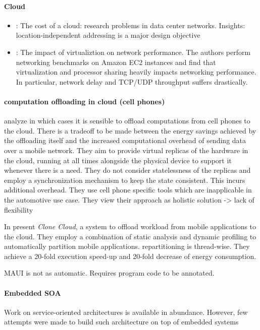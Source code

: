 \paragraph{Cloud}

\begin{itemize}
	\item \cite{greenberg2008cost}: The cost of a cloud: research problems in data center networks. Insights: location-independent addressing is a major design objective
	\item \cite{wang2010impact}: The impact of virtualiztion on network performance. The authors perform networking benchmarks on Amazon EC2 instances and find that virtualization and processor sharing heavily impacts networking performance. In particular, network delay and TCP/UDP throughput suffers drastically.
\end{itemize}

\paragraph{computation offloading in cloud (cell phones)}
\citeauthor*{barbera2013offload} \cite{barbera2013offload} analyze in which cases it is sensible to offload computations from cell phones to the cloud. There is a tradeoff to be made between the energy savings achieved by the offloading itself and the increased computational overhead of sending data over a mobile network. They aim to provide virtual replicas of the hardware in the cloud, running at all times alongside the physical device to support it whenever there is a need. They do not consider statelessness of the replicas and employ a synchronization mechanism to keep the state consistent. This incurs additional overhead. They use cell phone specific tools which are inapplicable in the automotive use case. They view their approach as holistic solution -> lack of flexibility

In \cite{chun2011clonecloud} \citeauthor*{barbera2013offload} present \emph{Clone Cloud}, a system to offload workload from mobile applications to the cloud. They employ a combination of static analysis and dynamic profiling to automatically partition mobile applications. repartitioning is thread-wise. They achieve a 20-fold execution speed-up and 20-fold decrease of energy consumption.

MAUI is not as automatic. Requires program code to be annotated.


\paragraph{Embedded SOA}
Work on service-oriented architectures is available in abundance. However, few attempts were made to build such architecture on top of embedded systems

